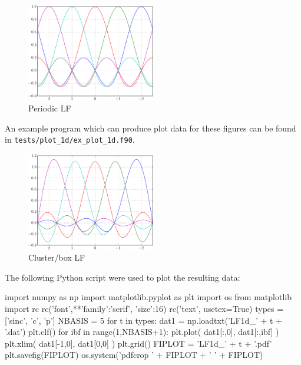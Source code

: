 \begin{figure}[h]
{\centering
\includegraphics[width=0.5\textwidth]{../../api_tests/plot_1d/LF1d_p.pdf}
\par}
\caption{Periodic LF}\label{fig:LF1d_p_5}
\end{figure}

An example program which can produce plot data for these figures can be
found in \texttt{tests/plot\_1d/ex\_plot\_1d.f90}.

\begin{figure}[h]
{\centering
\includegraphics[width=0.5\textwidth]{../../api_tests/plot_1d/LF1d_c.pdf}
\par}
\caption{Cluster/box LF}\label{fig:LF1d_c_5}
\end{figure}

The following Python script were used to plot the resulting data:
\begin{pythoncode}
import numpy as np
import matplotlib.pyplot as plt
import os
from matplotlib import rc
rc('font',**{'family':'serif', 'size':16})
rc('text', usetex=True)
types = ['sinc', 'c', 'p']
NBASIS = 5
for t in types:
    dat1 = np.loadtxt('LF1d_' + t + '.dat')
    plt.clf()
    for ibf in range(1,NBASIS+1):
        plt.plot( dat1[:,0], dat1[:,ibf] )
    plt.xlim( dat1[-1,0], dat1[0,0] )
    plt.grid()
    FIPLOT = 'LF1d_' + t + '.pdf'
    plt.savefig(FIPLOT)
    os.system('pdfcrop ' + FIPLOT + ' ' + FIPLOT)
\end{pythoncode}

